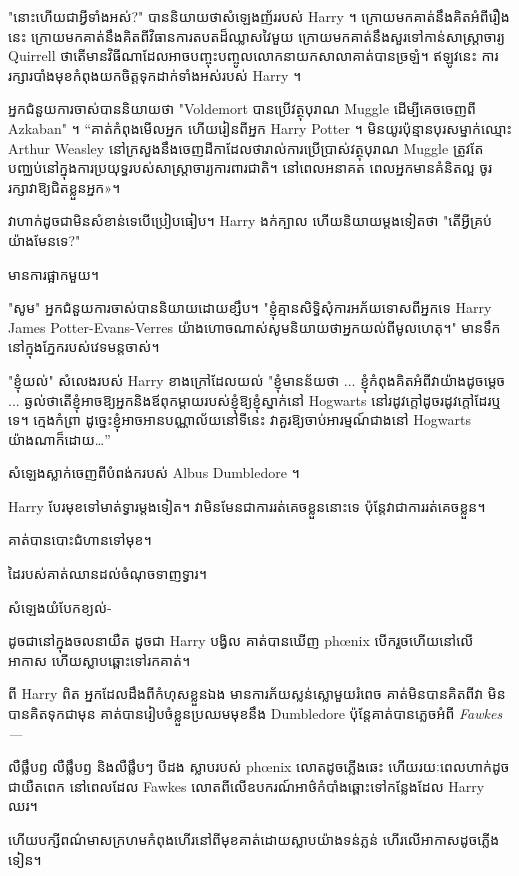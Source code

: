 {"នោះហើយជាអ្វីទាំងអស់?" បាននិយាយថាសំឡេងញ័ររបស់ Harry ។ ក្រោយមកគាត់នឹងគិតអំពីរឿងនេះ ក្រោយមកគាត់នឹងគិតពីវិធានការតបតដ៏ឈ្លាសវៃមួយ ក្រោយមកគាត់នឹងសួរទៅកាន់សាស្រ្តាចារ្យ Quirrell ថាតើមានវិធីណាដែលអាចបញ្ចុះបញ្ចូលលោកនាយកសាលាគាត់បានច្រឡំ។ ឥឡូវនេះ ការរក្សារបាំងមុខកំពុងយកចិត្តទុកដាក់ទាំងអស់របស់ Harry ។

អ្នកជំនួយការចាស់បាននិយាយថា "Voldemort បានប្រើវត្ថុបុរាណ Muggle ដើម្បីគេចចេញពី Azkaban" ។ “គាត់កំពុងមើលអ្នក ហើយរៀនពីអ្នក Harry Potter ។ មិនយូរប៉ុន្មានបុរសម្នាក់ឈ្មោះ Arthur Weasley នៅក្រសួងនឹងចេញដីកាដែលថារាល់ការប្រើប្រាស់វត្ថុបុរាណ Muggle ត្រូវតែបញ្ឈប់នៅក្នុងការប្រយុទ្ធរបស់សាស្ត្រាចារ្យការពារជាតិ។ នៅ​ពេល​អនាគត ពេល​អ្នក​មាន​គំនិត​ល្អ ចូរ​រក្សា​វា​ឱ្យ​ជិត​ខ្លួន​អ្នក​»។

វាហាក់ដូចជាមិនសំខាន់ទេបើប្រៀបធៀប។ Harry ងក់ក្បាល ហើយនិយាយម្តងទៀតថា "តើអ្វីគ្រប់យ៉ាងមែនទេ?"

មានការផ្អាកមួយ។

"សូម" អ្នកជំនួយការចាស់បាននិយាយដោយខ្សឹប។ "ខ្ញុំគ្មានសិទ្ធិសុំការអភ័យទោសពីអ្នកទេ Harry James Potter-Evans-Verres យ៉ាងហោចណាស់សូមនិយាយថាអ្នកយល់ពីមូលហេតុ។" មានទឹកនៅក្នុងភ្នែករបស់វេទមន្តចាស់។

"ខ្ញុំយល់" សំលេងរបស់ Harry ខាងក្រៅដែលយល់ "ខ្ញុំមានន័យថា ... ខ្ញុំកំពុងគិតអំពីវាយ៉ាងដូចម្ដេច ... ឆ្ងល់ថាតើខ្ញុំអាចឱ្យអ្នកនិងឪពុកម្តាយរបស់ខ្ញុំឱ្យខ្ញុំស្នាក់នៅ Hogwarts នៅរដូវក្តៅដូចរដូវក្តៅដែរឬទេ។ ក្មេងកំព្រា ដូច្នេះខ្ញុំអាចអានបណ្ណាល័យនៅទីនេះ វាគួរឱ្យចាប់អារម្មណ៍ជាងនៅ Hogwarts យ៉ាងណាក៏ដោយ…”

សំឡេងស្លាក់ចេញពីបំពង់ករបស់ Albus Dumbledore ។

Harry បែរមុខទៅមាត់ទ្វារម្តងទៀត។ វា​មិន​មែន​ជា​ការ​រត់​គេច​ខ្លួន​នោះ​ទេ ប៉ុន្តែ​វា​ជា​ការ​រត់​គេច​ខ្លួន។

គាត់បានបោះជំហានទៅមុខ។

ដៃរបស់គាត់ឈានដល់ចំណុចទាញទ្វារ។

សំឡេង​យំ​បែក​ខ្យល់-

ដូចជានៅក្នុងចលនាយឺត ដូចជា Harry បង្វិល គាត់បានឃើញ phœnix បើករួចហើយនៅលើអាកាស ហើយស្លាបឆ្ពោះទៅរកគាត់។

ពី Harry ពិត អ្នកដែលដឹងពីកំហុសខ្លួនឯង មានការភ័យស្លន់ស្លោមួយរំពេច គាត់មិនបានគិតពីវា មិនបានគិតទុកជាមុន គាត់បានរៀបចំខ្លួនប្រឈមមុខនឹង Dumbledore ប៉ុន្តែគាត់បានភ្លេចអំពី \emph{ Fawkes—}

លឺផ្លឹបឭ លឺផ្លឹបឭ និងលឺផ្លឹបៗ បីដង ស្លាបរបស់ phœnix លោតដូចភ្លើងឆេះ ហើយរយៈពេលហាក់ដូចជាយឺតពេក នៅពេលដែល Fawkes លោតពីលើឧបករណ៍អាថ៌កំបាំងឆ្ពោះទៅកន្លែងដែល Harry ឈរ។

ហើយ​បក្សី​ពណ៌​មាស​ក្រហម​កំពុង​ហើរ​នៅ​ពី​មុខ​គាត់​ដោយ​ស្លាប​យ៉ាង​ទន់ភ្លន់ ហើរ​លើ​អាកាស​ដូច​ភ្លើង​ទៀន។

}
